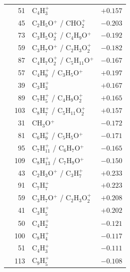 \begin{table}[htbp]
\begin{tabular}{l r l r}
 & 51 & C$_{4}$H$_{3}^{+}$ & $+0.157$ \\
 & 45 & C$_{2}$H$_{5}$O$^{+}$ / CHO$_{2}^{+}$ & $-0.203$ \\
 & 73 & C$_{3}$H$_{5}$O$_{2}^{+}$ / C$_{4}$H$_{9}$O$^{+}$ & $-0.192$ \\
 & 59 & C$_{3}$H$_{7}$O$^{+}$ / C$_{2}$H$_{3}$O$_{2}^{+}$ & $-0.182$ \\
 & 87 & C$_{4}$H$_{7}$O$_{2}^{+}$ / C$_{5}$H$_{11}$O$^{+}$ & $-0.167$ \\
\midrule
{} & 57 & C$_{4}$H$_{9}^{+}$ / C$_{3}$H$_{5}$O$^{+}$ & $+0.197$ \\
 & 39 & C$_{3}$H$_{3}^{+}$ & $+0.167$ \\
 & 89 & C$_{7}$H$_{5}^{+}$ / C$_{4}$H$_{9}$O$_{2}^{+}$ & $+0.165$ \\
 & 103 & C$_{8}$H$_{7}^{+}$ / C$_{5}$H$_{11}$O$_{2}^{+}$ & $+0.157$ \\
 & 31 & CH$_{3}$O$^{+}$ & $-0.172$ \\
 & 81 & C$_{6}$H$_{9}^{+}$ / C$_{5}$H$_{5}$O$^{+}$ & $-0.171$ \\
 & 95 & C$_{7}$H$_{11}^{+}$ / C$_{6}$H$_{7}$O$^{+}$ & $-0.165$ \\
 & 109 & C$_{8}$H$_{13}^{+}$ / C$_{7}$H$_{9}$O$^{+}$ & $-0.150$ \\
\midrule
{} & 43 & C$_{2}$H$_{3}$O$^{+}$ / C$_{3}$H$_{7}^{+}$ & $+0.233$ \\
 & 91 & C$_{7}$H$_{7}^{+}$ & $+0.223$ \\
 & 59 & C$_{3}$H$_{7}$O$^{+}$ / C$_{2}$H$_{3}$O$_{2}^{+}$ & $+0.208$ \\
 & 41 & C$_{3}$H$_{5}^{+}$ & $+0.202$ \\
 & 50 & C$_{4}$H$_{2}^{+}$ & $-0.121$ \\
 & 100 & C$_{8}$H$_{4}^{+}$ & $-0.117$ \\
 & 51 & C$_{4}$H$_{3}^{+}$ & $-0.111$ \\
 & 113 & C$_{9}$H$_{5}^{+}$ & $-0.108$ \\
\bottomrule
\end{tabular}
\end{table}
